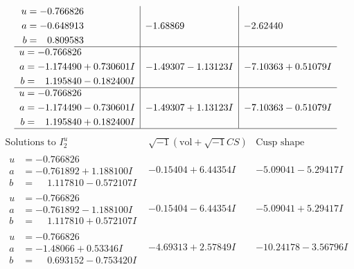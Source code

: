 \documentclass[1p]{elsarticle_modified}
\theoremstyle{definition}
\newcommand{\I}{\sqrt{-1}}
\begin{document}
$$\begin{array}{c|c|c}
\begin{aligned}
u &= -0.766826\phantom{ +0.000000I} \\
a &= -0.648913\phantom{ +0.000000I} \\
b &= \phantom{-}0.809583\phantom{ +0.000000I}\end{aligned}
 & -1.68869\phantom{ +0.000000I} & -2.62440\phantom{ +0.000000I} \\ \hline\begin{aligned}
u &= -0.766826\phantom{ +0.000000I} \\
a &= -1.174490 + 0.730601 I \\
b &= \phantom{-}1.195840 - 0.182400 I\end{aligned}
 & -1.49307 - 1.13123 I & -7.10363 + 0.51079 I \\ \hline\begin{aligned}
u &= -0.766826\phantom{ +0.000000I} \\
a &= -1.174490 - 0.730601 I \\
b &= \phantom{-}1.195840 + 0.182400 I\end{aligned}
 & -1.49307 + 1.13123 I & -7.10363 - 0.51079 I\\
 \hline 
 \end{array}$$\newpage$$\begin{array}{c|c|c}  
\text{Solutions to }I^u_{2}& \I (\text{vol} + \sqrt{-1}CS) & \text{Cusp shape}\\
 \hline 
\begin{aligned}
u &= -0.766826\phantom{ +0.000000I} \\
a &= -0.761892 + 1.188100 I \\
b &= \phantom{-}1.117810 - 0.572107 I\end{aligned}
 & -0.15404 + 6.44354 I & -5.09041 - 5.29417 I \\ \hline\begin{aligned}
u &= -0.766826\phantom{ +0.000000I} \\
a &= -0.761892 - 1.188100 I \\
b &= \phantom{-}1.117810 + 0.572107 I\end{aligned}
 & -0.15404 - 6.44354 I & -5.09041 + 5.29417 I \\ \hline\begin{aligned}
u &= -0.766826\phantom{ +0.000000I} \\
a &= -1.48066 + 0.53346 I \\
b &= \phantom{-}0.693152 - 0.753420 I\end{aligned}
 & -4.69313 + 2.57849 I & -10.24178 - 3.56796 I \\ \hline\begin{aligned}

\end{aligned}
\end{array}$$
\end{document}
